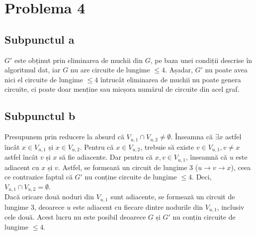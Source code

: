 \documentclass{article}
\begin{document}
\section*{\fontsize{20}{50}\selectfont Problema 4}

\subsection*{\fontsize{16}{30}\selectfont Subpunctul a}
{\fontsize{14}{16}\selectfont
$G'$ este obținut prin eliminarea de muchii din $G$, pe baza unei condiții descrise în algoritmul dat, iar $G$ nu are circuite de lungime $\le 4$. Așadar, $G'$ nu poate avea nici el circuite de lungime $\le 4$ întrucât eliminarea de muchii nu poate genera circuite, ci poate doar menține sau micșora numărul de circuite din acel graf.}

\subsection*{\fontsize{16}{30}\selectfont Subpunctul b}
{\fontsize{14}{16}\selectfont
Presupunem prin reducere la absurd că $V_{u,1} \cap V_{u,2} \neq \emptyset$. Înseamna că $\exists x$ astfel încât $x \in V_{u,1}$ și $x \in V_{u,2}$. Pentru că $x \in V_{u,2}$, trebuie să existe $v \in V_{u,1}, v \ne x$ astfel încât $v$ și $x$ să fie adiacente. Dar pentru că $x,v \in V_{u,1}$, înseamnă că $u$ este adiacent cu $x$ și $v$. Astfel, se formează un circuit de lungime 3 ($u \rightarrow v \rightarrow x$), ceea ce contrazice faptul că $G'$ nu conține circuite de lungime $\le 4$. Deci, $V_{u,1} \cap V_{u,2} = \emptyset$.}
\\
{\fontsize{14}{16}\selectfont
Dacă oricare două noduri din $V_{u,1}$ sunt adiacente, se formează un circuit de lungime 3, deoarece $u$ este adiacent cu fiecare dintre nodurile din $V_{u,1}$, inclusiv cele două. Acest lucru nu este posibil deoarece $G$ și $G'$ nu conțin circuite de lungime $\le 4$.}
\end{document}

